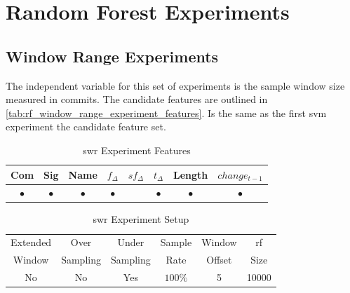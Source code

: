 \section{Random Forest Experiments}
\label{sec:rf_experiments}

\subsection{Window Range Experiments}
\label{sec:rf_swr_experiment}

The independent variable for this set of experiments is the sample window size measured in commits. The candidate features are outlined in \autoref{tab:rf_window_range_experiment_features}. Is the same as the first \gls{svm} experiment the candidate feature set.

\begin{table}[h]
\begin{center}

    \begin{tabular}{|c|c|c|c|c|c|c|c|}
        \hline
        Com & Sig & Name & $f_{\Delta}$ & $sf_{\Delta}$ & $t_\Delta$ & Length & $change_{t-1}$ \\
         \hline
        $\bullet$ & $\bullet$ & $\bullet$ & $\bullet$ & & $\bullet$ & $\bullet$ & $\bullet$ \\ \hline
    \end{tabular}
    \caption{\gls{swr} Experiment Features}
    \label{tab:rf_window_range_experiment_features}
\end{center}

\end{table}


\begin{table}[h]
\begin{center}

    \begin{tabular}{|c|c|c|c|c|c|}
        \hline
        Extended & Over & Under & Sample & Window & \gls{rf} \\
        Window & Sampling & Sampling & Rate & Offset & Size \\ \hline
        No & No & Yes & $100\%$ & 5 & 10000 \\ \hline
    \end{tabular}
    \caption{\gls{swr} Experiment Setup}
    \label{tab:rf_window_range_experiment_setup}
\end{center}

\end{table}

